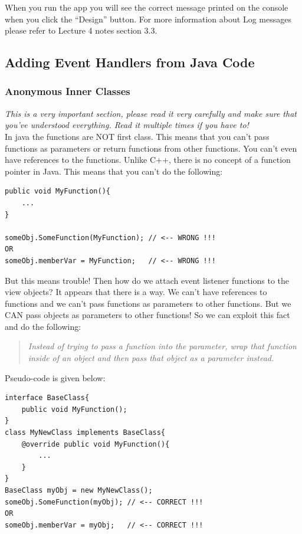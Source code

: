 When you run the app you will see the correct message printed on the console when you click the ``Design'' button. For more information about Log messages please refer to Lecture 4 notes section 3.3.

\subsection{Adding Event Handlers from Java Code}
\subsubsection{Anonymous Inner Classes}
\label{sec:anonInnerClass}

\textit{This is a very important section, please read it very carefully and make sure that you've understood everything. Read it multiple times if you have to!} \\

In java the functions are NOT first class. This means that you can't pass functions as parameters or return functions from other functions. You can't even have references to the functions. Unlike C++, there is no concept of a function pointer in Java. This means that you can't do the following:

\begin{verbatim}
public void MyFunction(){
    ...
}

someObj.SomeFunction(MyFunction); // <-- WRONG !!!
OR
someObj.memberVar = MyFunction;   // <-- WRONG !!!
\end{verbatim}

But this means trouble! Then how do we attach event listener functions to the view objects? It appears that there is a way. We can't have references to functions and we can't pass functions as parameters to other functions. But we CAN pass objects as parameters to other functions! So we can exploit this fact and do the following: 

\begin{quote}
	\textit{Instead of trying to pass a function into the parameter, wrap that function inside of an object and then pass that object as a parameter instead.}
\end{quote}

Pseudo-code is given below:

\begin{verbatim}
interface BaseClass{
    public void MyFunction();
}
class MyNewClass implements BaseClass{
    @override public void MyFunction(){
        ...
    }
}
BaseClass myObj = new MyNewClass();
someObj.SomeFunction(myObj); // <-- CORRECT !!!
OR
someObj.memberVar = myObj;   // <-- CORRECT !!!
\end{verbatim}

